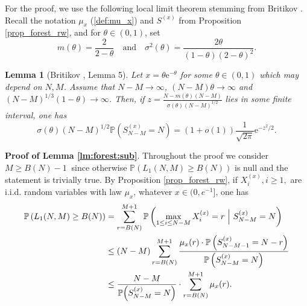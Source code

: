 \documentclass[a4, 11pt]{article}
\numberwithin{equation}{section}
\theoremstyle{plain}
\newtheorem{lemma}[theorem]{Lemma}
\theoremstyle{definition}
\theoremstyle{remark}
\begin{document}
For the proof, we use the following local limit theorem stemming from Britikov \cite{britikov88}. Recall the notation $\mu_x$ (\ref{def:mu_x}) and $S^{(x)}$ from Proposition \ref{prop_forest_rw}, and for $\theta\in (0,1)$, set
$$m(\theta)=\frac{2}{2-\theta}\quad \text{and}\quad \sigma^2(\theta)=\frac{2\theta}{(1-\theta)(2-\theta)^2}.$$

\smallskip

\begin{lemma}[Britikov \cite{britikov88}, Lemma 5]\label{lm:Britikov_sub}
	Let $x=\theta\mathrm{e}^{-\theta}$ for some $\theta\in (0,1)$ which may depend on $N,M$. Assume that $N-M \rightarrow \infty$,
	$(N-M)\theta\to \infty$ and $(N-M)^{1/3}(1-\theta) \to \infty$. Then, if $z=\frac{N-m(\theta)(N-M)}{\sigma(\theta)(N-M)^{1/2}}$ lies in some finite interval, one has
	$$\sigma(\theta)(N-M)^{1/2}\mathbb{P}\left(S_{N-M}^{(x)}=N\right)=\left(1+o(1)\right)\frac{1}{\sqrt{2\pi}}\mathrm{e}^{-z^2/2}.$$
\end{lemma}



\textbf{Proof of Lemma \ref{lm:forest:sub}}.
Throughout the proof we consider $M\geq B(N)-1~$ since otherwise $\mathbb{P}(L_1(N,M)\geq B(N))$ is null and the statement is trivially true. 
By Proposition \ref{prop_forest_rw}, if $X_i^{(x)},i\geq 1,$ are i.i.d. random variables with law $\mu_x$, whatever $x \in (0,e^{-1}]$, one has 
\begin{align}
		\mathbb{P}\left(L_1(N,M)\geq B(N)\right)&=\sum_{r=B(N)}^{M+1}\mathbb{P}\left(\max_{1\leq i\leq N-M} X_i^{(x)}=r~\Big\vert ~
		 S_{N-M}^{(x)}=N\right) \notag\\
		 &\leq (N-M)\sum_{r=B(N)}^{M+1}\frac{\mu_x(r) \cdot \mathbb{P}\left(S_{N-M-1}^{(x)}=N-r\right)}{\mathbb{P}\left(S_{N-M}^{(x)}=N\right)}\notag\\
		 &\leq \frac{N-M}{\mathbb{P}\Big(S_{N-M}^{(x)}=N\Big)} \cdot \sum_{r=B(N)}^{M+1}\mu_x(r).
		 \label{eq:bornesup_foret}
\end{align} 
\end{document}
